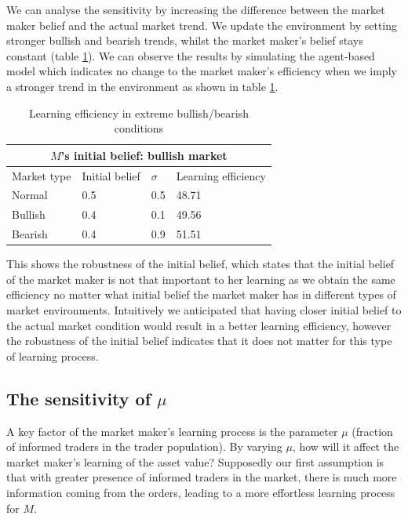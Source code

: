 \documentclass{article}
\begin{document}
We can analyse the sensitivity by increasing the difference between the market maker belief and the actual market trend. We update the environment by setting stronger bullish and bearish trends, whilst the market maker's belief stays constant (table \ref{tlb:extreme conditions}). We can observe the results by simulating the agent-based model which indicates no change to the market maker's efficiency when we imply a stronger trend in the environment as shown in table \ref{tlb:extreme conditions}. 

\begin{table}[ht]
    \centering
    \begin{tabular}{ |p{3cm}||p{3cm}|p{3cm}|p{3cm}|  }
        \hline
        \multicolumn{4}{|c|}{$M$'s initial belief: bullish market} \\
        \hline
        Market type& Initial belief & $\sigma$ & Learning efficiency\\
        \hline
        Normal & 0.5 & 0.5 & 48.71\\
        Bullish& 0.4 & 0.1 & 49.56\\
        Bearish& 0.4 & 0.9 & 51.51\\
        \hline
    \end{tabular}
    \caption{Learning efficiency in extreme bullish/bearish conditions}
    \label{tlb:extreme conditions}
\end{table}

 This shows the robustness of the initial belief, which states that the initial belief of the market maker is not that important to her learning as we obtain the same efficiency no matter what initial belief the market maker has in different types of market environments. Intuitively we anticipated that having closer initial belief to the actual market condition would result in a better learning efficiency, however the robustness of the initial belief indicates that it does not matter for this type of learning process.

\subsection{The sensitivity of $\mu$}
A key factor of the market maker's learning process is the parameter $\mu$ (fraction of informed traders in the trader population). By varying $\mu$, how will it affect the market maker's learning of the asset value? Supposedly our first assumption is that with greater presence of informed traders in the market, there is much more information coming from the orders, leading to a more effortless learning process for $M$.
\end{document}
